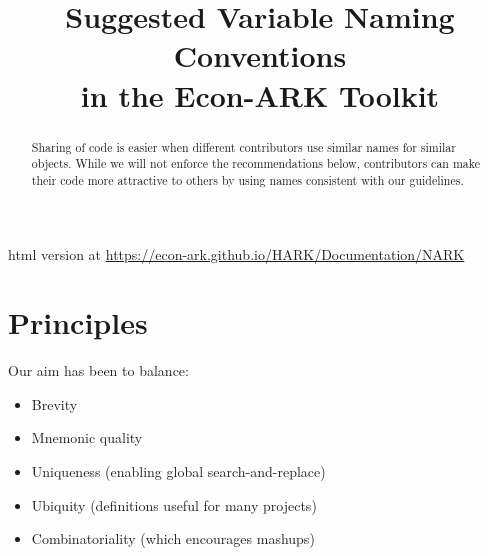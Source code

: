 \documentclass[12pt]{\econtex}
\begin{document}



\title{Suggested Variable Naming Conventions \\ in the Econ-ARK Toolkit}


\vspace{2in}



\maketitle 


\begin{abstract}
  Sharing of code is easier when different contributors use similar names for similar objects.  While we will not enforce the
  recommendations below, contributors can make their code more attractive to others 
  by using names consistent with our guidelines.  
\end{abstract}

\centerline{html version at \url{https://econ-ark.github.io/HARK/Documentation/NARK}}



\pagebreak

\section{Principles}
Our aim has been to balance:
\begin{itemize}
\item Brevity 
\item Mnemonic quality
\item Uniqueness (enabling global search-and-replace)
\item Ubiquity (definitions useful for many projects)
\item Combinatoriality (which encourages mashups)
\end{itemize}
\end{document}
